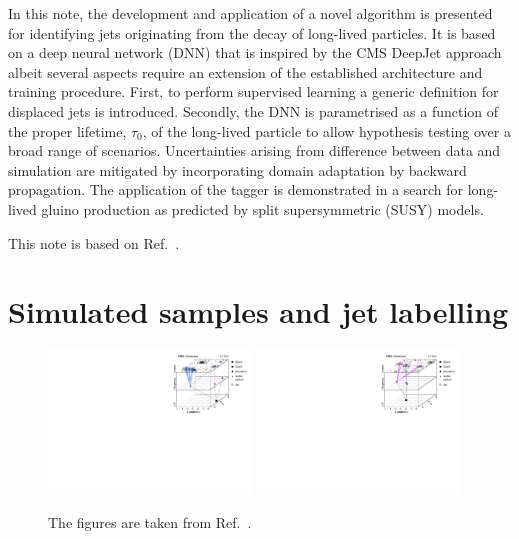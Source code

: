 \documentclass{webofc}
\begin{document}
In this note, the development and application of a novel algorithm is presented for identifying jets originating from the decay of long-lived particles. It is based on a deep neural network (DNN) that is inspired by the CMS DeepJet approach~\cite{} albeit several aspects require an extension of the established architecture and training procedure. First, to perform supervised learning a generic definition for displaced jets is introduced. Secondly, the DNN is parametrised as a function of the proper lifetime, $\tau_{0}$, of the long-lived particle to allow hypothesis testing over a broad range of scenarios. Uncertainties arising from difference between data and simulation are mitigated by incorporating domain adaptation by backward propagation.
The application of the tagger is demonstrated in a search for long-lived gluino production as predicted by split supersymmetric (SUSY) models.

This note is based on Ref.~\cite{CMS-EXO-19-011}.

\section{Simulated samples and jet labelling}
\label{sec-1}


\begin{figure}[!ht]
\includegraphics[width=0.48\textwidth]{figs/decay1.pdf}\hspace{0.03\textwidth}
\includegraphics[width=0.48\textwidth]{figs/decay2.pdf}
\centering
\caption{The figures are taken from Ref.~\cite{CMS-EXO-19-011}.}
\label{fig-1}
\end{figure}
\end{document}
